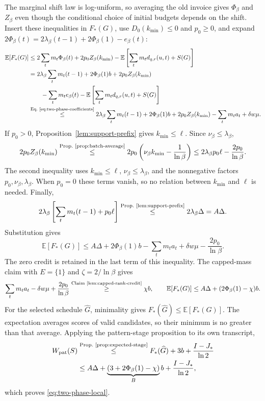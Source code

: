 The marginal shift law is log-uniform, so averaging the old invoice
gives $\Phi_\beta$ and $Z_\beta$ even though the conditional choice
of initial budgets depends on the shift. Insert these inequalities
in $F_*(G)$, use $D_0(k_{\min})\le0$ and $p_0\ge0$, and expand
$2\Phi_\beta(t)=2\lambda_\beta(t-1)+2\Phi_\beta(1)-e_\beta(t)$:
\[
 \begin{aligned}
 \mathbb E[F_*(G)]
 &\le2\sum_t m_t\Phi_\beta(t)+2p_0Z_\beta(k_{\min})
       -\mathbb E\left[\sum_t m_t d_{q,r}(u,t)+S(G)\right]\\
 &=2\lambda_\beta\sum_t m_t(t-1)+2\Phi_\beta(1)b
       +2p_0Z_\beta(k_{\min})\\
 &\qquad-\sum_t m_t e_\beta(t)
       -\mathbb E\left[\sum_t m_t d_{q,r}(u,t)+S(G)\right]\\
 &\byref{Eq.}{eq:two-phase-coefficients}{\le}2\lambda_\beta\sum_t m_t(t-1)+2\Phi_\beta(1)b
       +2p_0Z_\beta(k_{\min})-\sum_t m_ta_t+\delta w\mu.
 \end{aligned}
\]
If $p_0>0$, Proposition~\ref{lem:support-prefix} gives
$k_{\min}\le\ell$.
Since $\nu_\beta\le\lambda_\beta$,
\[
 2p_0Z_\beta(k_{\min})
 \byref{Prop.}{prop:batch-average}{\le}2p_0\left(\nu_\beta k_{\min}-\frac1{\ln\beta}\right)
 \le2\lambda_\beta p_0\ell-\frac{2p_0}{\ln\beta}.
\]
The second inequality uses $k_{\min}\le\ell$,
$\nu_\beta\le\lambda_\beta$, and the nonnegative factors
$p_0,\nu_\beta,\lambda_\beta$.
When $p_0=0$ these terms vanish, so no relation between
$k_{\min}$ and $\ell$ is needed. Finally,
\[
 2\lambda_\beta\left[\sum_t m_t(t-1)+p_0\ell\right]
 \byref{Prop.}{lem:support-prefix}{\le}2\lambda_\beta\Delta=A\Delta.
\]
Substitution gives
\[
 \mathbb E[F_*(G)]\le A\Delta+2\Phi_\beta(1)b
       -\sum_t m_t a_t+\delta w\mu-\frac{2p_0}{\ln\beta}.
\]
The zero credit is retained in the last term of this inequality.
The capped-mass claim with $E=\{1\}$ and $\zeta=2/\ln\beta$
gives
\[
 \sum_t m_ta_t-\delta w\mu+\frac{2p_0}{\ln\beta}\byref{Claim}{lem:capped-rank-credit}{\ge}\chi b,
 \qquad
 \mathbb E[F_*(G)]\le A\Delta+(2\Phi_\beta(1)-\chi)b.
\]
For the selected schedule $\widehat G$, minimality gives
$F_*(\widehat G)\le\mathbb E[F_*(G)]$.
The expectation averages scores of valid candidates, so their
minimum is no greater than that average.
Applying the pattern-stage proposition to its own transcript,
\[
 \begin{aligned}
 W_{\rm pat}(S)
 &\byref{Prop.}{prop:expected-stage}{\le}F_*(\widehat G)+3b+\frac{I-J_*}{\ln2}\\
 &\le A\Delta+
       \underbrace{(3+2\Phi_\beta(1)-\chi)}_{B}b
       +\frac{I-J_*}{\ln2},
 \end{aligned}
\]
which proves \eqref{eq:two-phase-local}.

